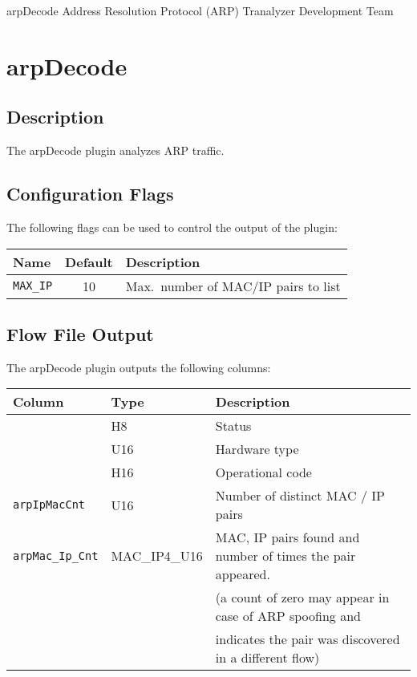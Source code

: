 \documentclass[documentation]{subfiles}
\begin{document}
\trantitle
    {arpDecode}
    {Address Resolution Protocol (ARP)}
    {Tranalyzer Development Team} %

\section{arpDecode}\label{s:arpDecode}

\subsection{Description}
The arpDecode plugin analyzes ARP traffic.

\subsection{Configuration Flags}
The following flags can be used to control the output of the plugin:
\begin{longtable}{lcl}
    \toprule
    {\bf Name} & {\bf Default} & {\bf Description}\\
    \midrule\endhead%
    {\tt MAX\_IP} & 10 & Max.\ number of MAC/IP pairs to list\\
    \bottomrule
\end{longtable}

\subsection{Flow File Output}
The arpDecode plugin outputs the following columns:
\begin{longtable}{lll}
    \toprule
    {\bf Column} & {\bf Type} & {\bf Description}\\
    \midrule\endhead%
    {\tt \nameref{arpStat}}   & H8  & Status\\
    {\tt \nameref{arpHwType}} & U16 & Hardware type\\
    {\tt \nameref{arpOpcode}} & H16 & Operational code\\
    {\tt arpIpMacCnt}         & U16 & Number of distinct MAC / IP pairs\\
    {\tt arpMac\_Ip\_Cnt} & MAC\_IP4\_U16 & MAC, IP pairs found and number of times the pair appeared.\\
                          &               & (a count of zero may appear in case of ARP spoofing and \\
                          &               & indicates the pair was discovered in a different flow)\\
    \bottomrule
\end{longtable}
\end{document}
